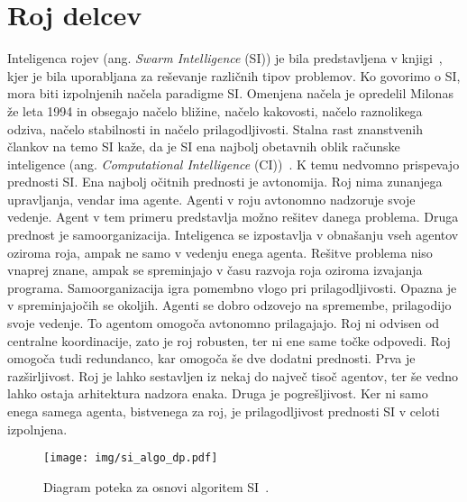 \section{Roj delcev}

Inteligenca rojev (ang. \textit{Swarm Intelligence} (SI)) je bila predstavljena v knjigi~\cite{bib:swarm_intelligence}, kjer je bila uporabljana za reševanje različnih tipov problemov.
Ko govorimo o SI, mora biti izpolnjenih načela paradigme SI.
Omenjena načela je opredelil Milonas~\cite{bib:si_principles} že leta 1994 in obsegajo načelo bližine, načelo kakovosti, načelo raznolikega odziva, načelo stabilnosti in načelo prilagodljivosti.
Stalna rast znanstvenih člankov na temo SI kaže, da je SI ena najbolj obetavnih oblik računske inteligence (ang. \textit{Computational Intelligence} (CI))~\cite{bib:computational_intelligence}.
K temu nedvomno prispevajo prednosti SI.
Ena najbolj očitnih prednosti je avtonomija.
Roj nima zunanjega upravljanja, vendar ima agente.
Agenti v roju avtonomno nadzoruje svoje vedenje.
Agent v tem primeru predstavlja možno rešitev danega problema.
Druga prednost je samoorganizacija.
Inteligenca se izpostavlja v obnašanju vseh agentov oziroma roja, ampak ne samo v vedenju enega agenta.
Rešitve problema niso vnaprej znane, ampak se spreminjajo v času razvoja roja oziroma izvajanja programa.
Samoorganizacija igra pomembno vlogo pri prilagodljivosti.
Opazna je v spreminjajočih se okoljih.
Agenti se dobro odzovejo na spremembe, prilagodijo svoje vedenje.
To agentom omogoča avtonomno prilagajajo.
Roj ni odvisen od centralne koordinacije, zato je roj robusten, ter ni ene same točke odpovedi.
Roj omogoča tudi redundanco, kar omogoča še dve dodatni prednosti.
Prva je razširljivost.
Roj je lahko sestavljen iz nekaj do največ tisoč agentov, ter še vedno lahko ostaja arhitektura nadzora enaka.
Druga je pogrešljivost.
Ker ni samo enega samega agenta, bistvenega za roj, je prilagodljivost prednosti SI v celoti izpolnjena.

\begin{figure}[ht]
    \centering
    \texttt{[image: img/si\_algo\_dp.pdf]}
    \caption{Diagram poteka za osnovi algoritem SI~\cite{bib:swarm_intelligence}.}\label{fig:si_algo_dp}
\end{figure}

